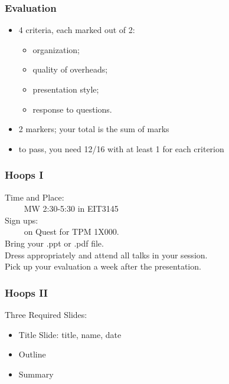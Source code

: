\documentclass{beamer}
\begin{document}
\begin{frame}

\frametitle{Evaluation}

\begin{itemize}
\item 4 criteria, each marked out of 2:
\begin{itemize}
\item organization;
\item quality of overheads;
\item presentation style;
\item response to questions.
\end{itemize}
\item 2 markers; your total is the sum of marks
\item to pass, you need 12/16 with at least 1 for each criterion
\end{itemize}

\end{frame}

\begin{frame}

\frametitle{Hoops I}

Time and Place: \\
$\qquad$ MW 2:30-5:30 in EIT3145\\[2em]

Sign ups: \\
$\qquad$ on Quest for TPM 1X000.\\[2em]

Bring your .ppt or .pdf file.\\[1em]

Dress appropriately and attend all talks in your session.\\[1em]

Pick up your evaluation a week after the presentation.

\end{frame}

\begin{frame}

\frametitle{Hoops II}
\Large

Three Required Slides:
\begin{itemize}
\item Title Slide: title, name, date
\item Outline
\item Summary
\end{itemize}

\end{frame}
\end{document}
